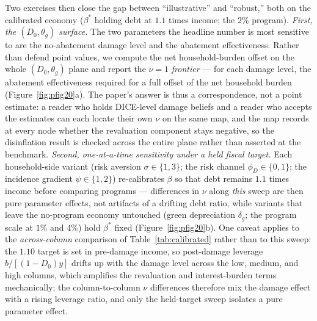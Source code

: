 \documentclass[12pt]{article}
\begin{document}
Two exercises then close the gap between ``illustrative'' and ``robust,''
both on the calibrated economy ($\beta^{*}$ holding debt at $1.1$ times
income; the $2\%$ program). \emph{First, the $(D_0,\theta_g)$ surface.}
The two parameters the headline number is most sensitive to are the
no-abatement damage level and the abatement effectiveness. Rather than
defend point values, we compute the net household-burden offset on the whole
$(D_0,\theta_g)$ plane and report the $\nu=1$ \emph{frontier} --- for each
damage level, the abatement effectiveness required for a full offset of the net household burden
(Figure~\ref{fig:pfig20}a). The paper's answer is thus a correspondence,
not a point estimate: a reader who holds DICE-level damage beliefs and a
reader who accepts the \citet{bilalkanzig2024} estimates can each locate
their own $\nu$ on the same map, and the map records at every node whether
the revaluation component stays negative, so the disinflation result is
checked across the entire plane rather than asserted at the benchmark.
\emph{Second, one-at-a-time sensitivity under a held fiscal target.} Each
household-side variant (risk aversion $\sigma\in\{1,3\}$; the risk channel
$\phi_D\in\{0,1\}$; the incidence gradient $\psi\in\{1,2\}$) re-calibrates
$\beta$ so that debt remains $1.1$ times income before comparing programs
--- differences in $\nu$ along \emph{this} sweep are then pure parameter
effects, not artifacts of a drifting debt ratio, while variants that
leave the no-program economy untouched (green depreciation $\delta_g$; the
program scale at $1\%$ and $4\%$) hold $\beta^{*}$ fixed
(Figure~\ref{fig:pfig20}b). One caveat applies to the \emph{across-column}
comparison of Table~\ref{tab:calibrated} rather than to this sweep: the
$1.10$ target is set in pre-damage income, so post-damage leverage
$b/[(1-D_0)y]$ drifts up with the damage level across the low, medium, and
high columns, which amplifies the
revaluation and interest-burden terms mechanically; the column-to-column
$\nu$ differences therefore mix the damage effect with a rising leverage
ratio, and only the held-target sweep isolates a pure parameter effect.
\end{document}
